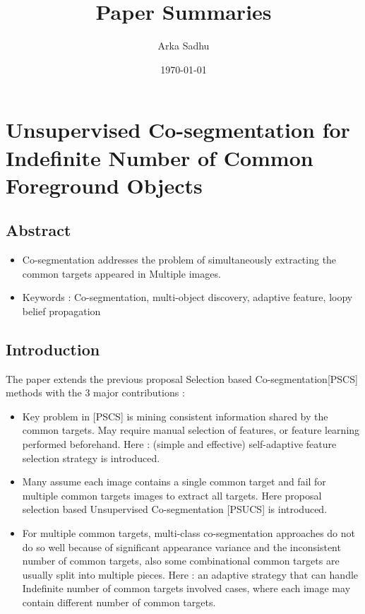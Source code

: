 \documentclass{article}
\title{Paper Summaries}
\author{
  Arka Sadhu}
\date{\today}
\begin{document}
\maketitle

\tableofcontents
\newpage

\section{Unsupervised Co-segmentation for Indefinite Number of Common Foreground Objects}
\cite{7401081}
\subsection{Abstract}
\begin{itemize}
\item Co-segmentation addresses the problem of simultaneously extracting the common targets appeared in Multiple images.
\item Keywords : Co-segmentation, multi-object discovery, adaptive feature, loopy belief propagation
\end{itemize}

\subsection{Introduction}
The paper extends the previous proposal Selection based Co-segmentation[PSCS] methods with the 3 major contributions :
\begin{itemize}
\item Key problem in [PSCS] is mining consistent information shared by the common targets. May require manual selection of features, or feature learning performed beforehand. Here : (simple and effective) self-adaptive feature selection strategy is introduced.
\item Many assume each image contains a single common target and fail for multiple common targets images to extract all targets. Here proposal selection based Unsupervised Co-segmentation [PSUCS] is introduced.
\item For multiple common targets, multi-class co-segmentation approaches do not do so well because of significant appearance variance and the inconsistent number of common targets, also some combinational common targets are usually split into multiple pieces. Here : an adaptive strategy that can handle Indefinite number of common targets involved cases, where each image may contain different number of common targets.
\end{itemize}
\end{document}
